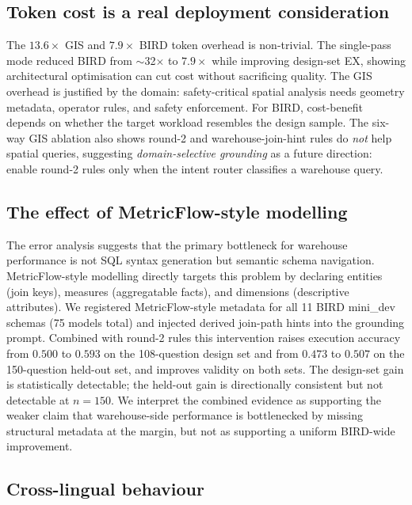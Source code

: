 \documentclass[11pt]{article}
\begin{document}
\subsection{Token cost is a real deployment consideration}

The $13.6\times$ GIS and $7.9\times$ BIRD token overhead is non-trivial. The single-pass mode reduced BIRD from $\sim$32$\times$ to $7.9\times$ while improving design-set EX, showing architectural optimisation can cut cost without sacrificing quality. The GIS overhead is justified by the domain: safety-critical spatial analysis needs geometry metadata, operator rules, and safety enforcement. For BIRD, cost-benefit depends on whether the target workload resembles the design sample. The six-way GIS ablation also shows round-2 and warehouse-join-hint rules do \emph{not} help spatial queries, suggesting \emph{domain-selective grounding} as a future direction: enable round-2 rules only when the intent router classifies a warehouse query.

\subsection{The effect of MetricFlow-style modelling}

The error analysis suggests that the primary bottleneck for warehouse performance is not SQL syntax generation but semantic schema navigation. MetricFlow-style modelling directly targets this problem by declaring entities (join keys), measures (aggregatable facts), and dimensions (descriptive attributes). We registered MetricFlow-style metadata for all 11 BIRD mini\_dev schemas (75 models total) and injected derived join-path hints into the grounding prompt. Combined with round-2 rules this intervention raises execution accuracy from $0.500$ to $0.593$ on the 108-question design set and from $0.473$ to $0.507$ on the 150-question held-out set, and improves validity on both sets. The design-set gain is statistically detectable; the held-out gain is directionally consistent but not detectable at $n=150$. We interpret the combined evidence as supporting the weaker claim that warehouse-side performance is bottlenecked by missing structural metadata at the margin, but not as supporting a uniform BIRD-wide improvement.

\subsection{Cross-lingual behaviour}
\end{document}
